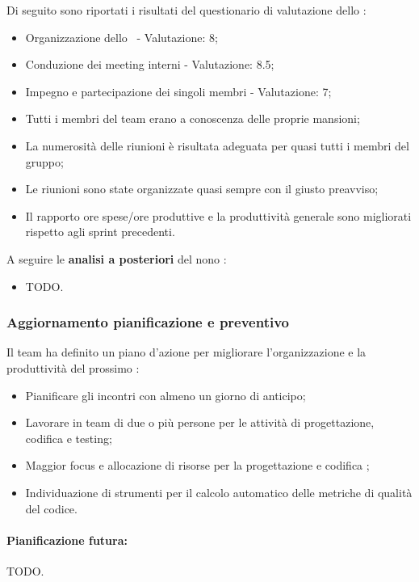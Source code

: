 \par Di seguito sono riportati i risultati del questionario di valutazione dello :
\begin{itemize}
  \item Organizzazione dello \ - Valutazione: 8;
  \item Conduzione dei meeting interni - Valutazione: 8.5;
  \item Impegno e partecipazione dei singoli membri - Valutazione: 7;
  \item Tutti i membri del team erano a conoscenza delle proprie mansioni;
  \item La numerosità delle riunioni è risultata adeguata per quasi tutti i membri del gruppo;
  \item Le riunioni sono state organizzate quasi sempre con il giusto preavviso;
  \item Il rapporto ore spese/ore produttive e la produttività generale sono migliorati rispetto agli sprint precedenti.
\end{itemize}

\vspace{0.5\baselineskip}
\par A seguire le \textbf{analisi a posteriori} del nono :
\begin{itemize}
  \item TODO.
\end{itemize}

\subsubsection{Aggiornamento pianificazione e preventivo}
\par Il team ha definito un piano d'azione per migliorare l'organizzazione e la produttività del prossimo :
\begin{itemize}
  \item Pianificare gli incontri con almeno un giorno di anticipo;
  \item Lavorare in team di due o più persone per le attività di progettazione, codifica e testing;
  \item Maggior focus e allocazione di risorse per la progettazione e codifica ;
  \item Individuazione di strumenti per il calcolo automatico delle metriche di qualità del codice.
\end{itemize}

\paragraph*{Pianificazione futura:}
\par TODO.

